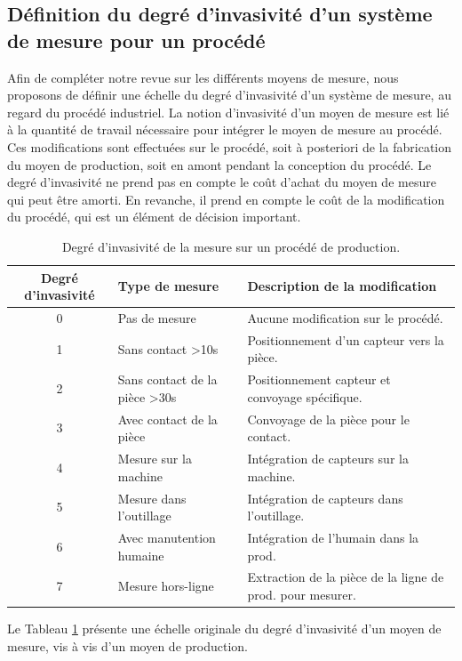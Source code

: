 \subsection{Définition du degré d'invasivité d'un système de mesure pour un procédé}
Afin de compléter notre revue sur les différents moyens de mesure, nous proposons de définir une échelle du degré d'invasivité d'un système de mesure, au regard du procédé industriel.
La notion d'invasivité d'un moyen de mesure est lié à la quantité de travail nécessaire pour intégrer le moyen de mesure au procédé.
Ces modifications sont effectuées sur le procédé, soit à posteriori de la fabrication du moyen de production, soit en amont pendant la conception du procédé.
Le degré d'invasivité ne prend pas en compte le coût d'achat du moyen de mesure qui peut être amorti.
En revanche, il prend en compte le coût de la modification du procédé, qui est un élément de décision important.

\begin{table}[tbp]
	\hspace*{-5mm}
	\begin{tabular}{|c|l|l|}
		\arrayrulecolor{black}
		\hline
		Degré d'invasivité & Type de mesure & Description de la modification \\
		\hline \hline
		0 & Pas de mesure & Aucune modification sur le procédé. \\ \hline
		1 & Sans contact >10s & Positionnement d'un capteur vers la pièce. \\ \hline
		2 & Sans contact de la pièce >30s & Positionnement capteur et convoyage spécifique. \\ \hline
		3 & Avec contact de la pièce & Convoyage de la pièce pour le contact. \\ \hline
		4 & Mesure sur la machine & Intégration de capteurs sur la machine.  \\ \hline
		5 & Mesure dans l'outillage & Intégration de capteurs dans l'outillage. \\ \hline
		6 & Avec manutention humaine & Intégration de l'humain dans la prod. \\ \hline
		7 & Mesure hors-ligne & Extraction de la pièce de la ligne de prod. pour mesurer. \\ \hline
	\end{tabular}
	\caption{Degré d'invasivité de la mesure sur un procédé de production.}
	\label{tab:measure_invasivity}
\end{table}

\noindent
Le Tableau \ref{tab:measure_invasivity} présente une échelle originale du degré d'invasivité d'un moyen de mesure, vis à vis d'un moyen de production.

